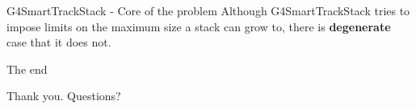 \documentclass{beamer}
\begin{document}
\begin{frame}{G4SmartTrackStack - Core of the problem}
Although G4SmartTrackStack tries to impose limits on the maximum size a
stack can grow to, there is {\bf degenerate} case that it does not.
\end{frame}

\begin{frame}{The end}
\vspace*{\fill}
\begin{center}
Thank you. Questions?
\end{center}
\vspace*{\fill}
\end{frame}
\end{document}
